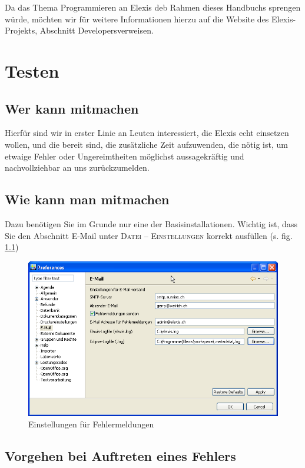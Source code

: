 Da das Thema \glqq Programmieren an Elexis\grqq{} deb Rahmen dieses Handbuchs
sprengen würde, möchten wir für weitere Informationen hierzu auf die Website des
Elexis-Projekts, Abschnitt \glqq Developers\grqq{}verweisen.

\chapter{Testen}
\section{Wer kann mitmachen}
Hierfür sind wir in erster Linie an Leuten interessiert, die Elexis \glqq
echt\grqq{} einsetzen wollen, und die bereit sind, die zusätzliche Zeit
aufzuwenden, die nötig ist, um etwaige Fehler oder Ungereimtheiten möglichst
aussagekräftig und nachvollziehbar an uns zurückzumelden.
\section{Wie kann man mitmachen}
\label{senderrors}
Dazu benötigen Sie im Grunde nur eine der Basisinstallationen. Wichtig ist, dass
Sie den Abschnitt \glqq E-Mail\grqq{} unter \textsc{Datei -- Einstellungen}
korrekt ausfüllen (s. fig. \ref{fig:mailsettings})
\begin{figure}[htp]
\begin{center}
  \includegraphics[width=150mm]{images/mailsettings}
  \caption{Einstellungen für Fehlermeldungen}
  \label{fig:mailsettings}
\end{center}
\end{figure}
\section{Vorgehen bei Auftreten eines Fehlers}

